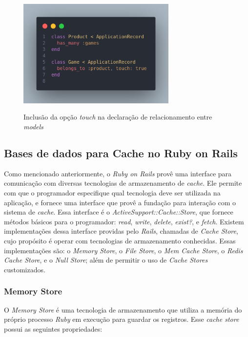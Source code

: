 \begin{figure}
    \centering
    \caption{Inclusão da opção \textit{touch} na declaração de relacionamento entre \textit{models}}
    \includegraphics[width=0.7\textwidth]{figuras/russian_doll_touch_true.png}
    \label{fig:russian_doll_touch_true}
\end{figure}

\subsection{Bases de dados para Cache no Ruby on Rails}
\label{sec:bases_de_dados_para_cache_no_ruby_on_rails}

Como mencionado anteriormente, o \textit{Ruby on Rails} provê uma interface para comunicação com diversas tecnologias de armazenamento de \textit{cache}. Ele permite com que o programador especifique qual tecnologia deve ser utilizada na aplicação, e fornece uma interface que provê a fundação para interação com o sistema de \textit{cache}. Essa interface é o \textit{ActiveSupport::Cache::Store}, que fornece métodos básicos para o programador: \textit{read}, \textit{write}, \textit{delete}, \textit{exist?}, e \textit{fetch}. Existem implementações dessa interface providas pelo \textit{Rails}, chamadas de \textit{Cache Store}, cujo propósito é operar com tecnologias de armazenamento conhecidas. Essas implementações são: o \textit{Memory Store}, o \textit{File Store}, o \textit{Mem Cache Store}, o \textit{Redis Cache Store}, e o \textit{Null Store}; além de permitir o uso de \textit{Cache Stores} customizados.

\subsubsection{Memory Store}

O \textit{Memory Store} é uma tecnologia de armazenamento que utiliza a memória do próprio processo \textit{Ruby} em execução para guardar os registros. Esse \textit{cache store} possui as seguintes propriedades:


